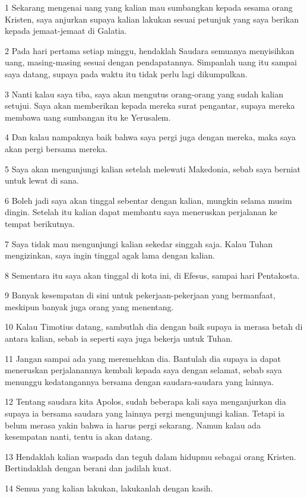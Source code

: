 \par 1 Sekarang mengenai uang yang kalian mau sumbangkan kepada sesama orang Kristen, saya anjurkan supaya kalian lakukan sesuai petunjuk yang saya berikan kepada jemaat-jemaat di Galatia.
\par 2 Pada hari pertama setiap minggu, hendaklah Saudara semuanya menyisihkan uang, masing-masing sesuai dengan pendapatannya. Simpanlah uang itu sampai saya datang, supaya pada waktu itu tidak perlu lagi dikumpulkan.
\par 3 Nanti kalau saya tiba, saya akan mengutus orang-orang yang sudah kalian setujui. Saya akan memberikan kepada mereka surat pengantar, supaya mereka membawa uang sumbangan itu ke Yerusalem.
\par 4 Dan kalau nampaknya baik bahwa saya pergi juga dengan mereka, maka saya akan pergi bersama mereka.
\par 5 Saya akan mengunjungi kalian setelah melewati Makedonia, sebab saya berniat untuk lewat di sana.
\par 6 Boleh jadi saya akan tinggal sebentar dengan kalian, mungkin selama musim dingin. Setelah itu kalian dapat membantu saya meneruskan perjalanan ke tempat berikutnya.
\par 7 Saya tidak mau mengunjungi kalian sekedar singgah saja. Kalau Tuhan mengizinkan, saya ingin tinggal agak lama dengan kalian.
\par 8 Sementara itu saya akan tinggal di kota ini, di Efesus, sampai hari Pentakosta.
\par 9 Banyak kesempatan di sini untuk pekerjaan-pekerjaan yang bermanfaat, meskipun banyak juga orang yang menentang.
\par 10 Kalau Timotius datang, sambutlah dia dengan baik supaya ia merasa betah di antara kalian, sebab ia seperti saya juga bekerja untuk Tuhan.
\par 11 Jangan sampai ada yang meremehkan dia. Bantulah dia supaya ia dapat meneruskan perjalanannya kembali kepada saya dengan selamat, sebab saya menunggu kedatangannya bersama dengan saudara-saudara yang lainnya.
\par 12 Tentang saudara kita Apolos, sudah beberapa kali saya menganjurkan dia supaya ia bersama saudara yang lainnya pergi mengunjungi kalian. Tetapi ia belum merasa yakin bahwa ia harus pergi sekarang. Namun kalau ada kesempatan nanti, tentu ia akan datang.
\par 13 Hendaklah kalian waspada dan teguh dalam hidupmu sebagai orang Kristen. Bertindaklah dengan berani dan jadilah kuat.
\par 14 Semua yang kalian lakukan, lakukanlah dengan kasih.
